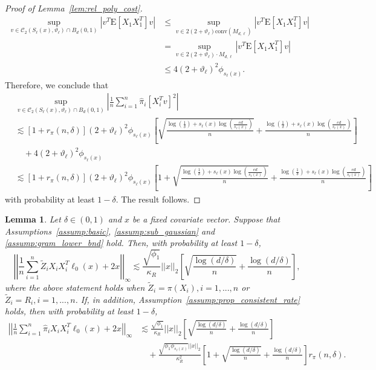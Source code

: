 \documentclass[ejsv2,noshowframe]{imsart}
\theoremstyle{plain}
\newtheorem{lemma}[theorem]{Lemma}
\theoremstyle{definition}
\theoremstyle{remark}
\newcommand{\norm}[1]{\left|\left| #1 \right|\right|}
\renewcommand{\hat}{\widehat}
\renewcommand{\tilde}{\widetilde}
\begin{document}
\begin{proof}[Proof of Lemma~\ref{lem:rel_poly_cost}]
\begin{align*}
		\sup_{v\in \mathcal{C}_2\left(S_{\ell}(x), \vartheta_{\ell}\right)\cap B_d(0,1)} \left|v^T \mathrm{E}\left[X_1X_1^T\right] v\right| &\leq \sup_{v \in 2(2+\vartheta_{\ell}) \mathrm{conv}(M_{d,\ell})} \left|v^T \mathrm{E}\left[X_1X_1^T\right] v\right|\\
		&= \sup_{v \in 2(2+\vartheta_{\ell}) \cdot M_{d,\ell}} \left|v^T \mathrm{E}\left[X_1X_1^T\right] v\right|\\
		&\leq 4(2+\vartheta_{\ell})^2 \phi_{s_{\ell}(x)}.
	\end{align*}
	Therefore, we conclude that
	\begin{align*}
		&\sup_{v\in \mathcal{C}_2\left(S_{\ell}(x), \vartheta_{\ell}\right)\cap B_d(0,1)} \left|\frac{1}{n} \sum_{i=1}^n \hat{\pi}_i\left[X_i^Tv\right]^2 \right| \\
		&\lesssim \left[1+r_{\pi}(n,\delta)\right] (2+\vartheta_{\ell})^2 \phi_{s_{\ell}(x)}\left[\sqrt{\frac{\log(\frac{1}{\delta})+s_{\ell}(x)\log\left(\frac{ed}{s_{\ell}(x)}\right)}{n}} + \frac{\log(\frac{1}{\delta})+s_{\ell}(x)\log\left(\frac{ed}{s_{\ell}(x)}\right)}{n}\right]\\
		&\quad + 4(2+\vartheta_{\ell})^2 \phi_{s_{\ell}(x)}\\
		&\lesssim \left[1+r_{\pi}(n,\delta)\right] (2+\vartheta_{\ell})^2 \phi_{s_{\ell}(x)}\left[1+\sqrt{\frac{\log(\frac{1}{\delta})+s_{\ell}(x)\log\left(\frac{ed}{s_{\ell}(x)}\right)}{n}} + \frac{\log(\frac{1}{\delta})+s_{\ell}(x)\log\left(\frac{ed}{s_{\ell}(x)}\right)}{n}\right]
	\end{align*}
	with probability at least $1-\delta$. The result follows.
\end{proof}

\vspace{3mm}

\begin{lemma}
	\label{lem:gamma_rate}
	Let $\delta \in (0,1)$ and $x$ be a fixed covariate vector. Suppose that Assumptions~\ref{assump:basic}, \ref{assump:sub_gaussian} and \ref{assump:gram_lower_bnd} hold. Then, with probability at least $1-\delta$, 
	$$\norm{\frac{1}{n}\sum_{i=1}^n \tilde{Z}_i X_iX_i^T \ell_0(x) + 2x}_{\infty} \lesssim \frac{\sqrt{\phi_1}}{\kappa_R}\norm{x}_2 \left[\sqrt{\frac{\log(d/\delta)}{n}} + \frac{\log(d/\delta)}{n} \right],$$
	where the above statement holds when $\tilde{Z}_i = \pi(X_i), i=1,...,n$ or $\tilde{Z}_i =R_i, i=1,...,n$. If, in addition, Assumption~\ref{assump:prop_consistent_rate} holds, then with probability at least $1-\delta$,
	\begin{align*}
		\norm{\frac{1}{n}\sum_{i=1}^n \hat{\pi}_i X_i X_i^T \ell_0(x) + 2x}_{\infty} &\lesssim \frac{\sqrt{\phi_1}}{\kappa_R}\norm{x}_2 \left[\sqrt{\frac{\log(d/\delta)}{n}} + \frac{\log(d/\delta)}{n} \right]\\
		&\quad + \frac{\sqrt{\phi_1 \phi_{s_{\ell}(x)}}\norm{x}_2}{\kappa_R^2} \left[1 + \sqrt{\frac{\log(d/\delta)}{n}} + \frac{\log(d/\delta)}{n}\right] r_{\pi}(n,\delta).
	\end{align*}
\end{lemma}
\end{document}
